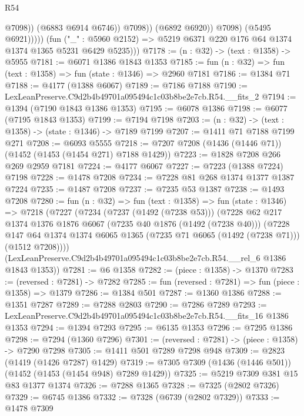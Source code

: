 \begin{lexlean}{R54}
\begin{coremodule}
                              @7098))
                          (@6883 @6914 @6746))
                        @7098))
                    (@6892 @6920))
                  @7098)
                (@5495 @6921)))))
        (fun ("_" : @5960 @2152) => @5219 @6371 @220 @176 @64 @1374 @1374 @1365 @5231 @6429 @5235)))
@7178 := (n : @32) -> (text : @1358) -> @5955
@7181 := @6071 @1386 @1843 @1353
@7185 := fun (n : @32) => fun (text : @1358) => fun (state : @1346) => @2960 @7181
@7186 := @1384 @71
@7188 := @4177 (@1388 @6067)
@7189 := @7186 @7188
@7190 := LexLeanPreserve.C9d2b4b49701a095494c1c03b8be2e7cb.R54.__fits_2
@7194 := @1394 (@7190 @1843 @1386 @1353)
@7195 := @6078 @1386
@7198 := @6077 (@7195 @1843 @1353)
@7199 := @7194 @7198
@7203 := (n : @32) -> (text : @1358) -> (state : @1346) -> @7189 @7199
@7207 := @1411 @71 @7188 @7199 @271
@7208 := @6093 @5555
@7218 := @7207 @7208 (@1436 (@1446 @71)) (@1452 (@1453 (@1454 @271) @7188 @1429))
@7223 := @1828 @7208 @266 @269 @2959 @7181
@7224 := @4177 @6067
@7227 := @7223 (@1388 @7224) @7198
@7228 := @1478 @7208
@7234 := @7228 @81 @268 @1374 @1377 @1387 @7224
@7235 := @1487 @7208
@7237 := @7235 @53 @1387
@7238 := @1493 @7208
@7280 := fun (n : @32) =>
  fun (text : @1358) =>
  fun (state : @1346) =>
  @7218
    (@7227
      (@7234
        (@7237 (@1492 (@7238 @53)))
        (@7228
          @62
          @217
          @1374
          @1376
          @1876
          @6067
          (@7235 @40 @1876 (@1492 (@7238 @40)))
          (@7228
            @147
            @64
            @1374
            @1374
            @6065
            @1365
            (@7235 @71 @6065 (@1492 (@7238 @71)))
            (@1512 @7208))))
      (LexLeanPreserve.C9d2b4b49701a095494c1c03b8be2e7cb.R54.__rel_6 @1386 @1843 @1353))
@7281 := @6 @1358
@7282 := (piece : @1358) -> @1370
@7283 := (reversed : @7281) -> @7282
@7285 := fun (reversed : @7281) => fun (piece : @1358) => @1379
@7286 := @1384 @501
@7287 := @1360 @1386
@7288 := @1351 @7287
@7289 := @7288 @2803
@7290 := @7286 @7289
@7293 := LexLeanPreserve.C9d2b4b49701a095494c1c03b8be2e7cb.R54.__fits_16 @1386 @1353
@7294 := @1394 @7293
@7295 := @6135 @1353
@7296 := @7295 @1386
@7298 := @7294 (@1360 @7296)
@7301 := (reversed : @7281) -> (piece : @1358) -> @7290 @7298
@7305 := @1411 @501 @7289 @7298 @948
@7309 := @2823 (@1419 (@1426 @7287) @1429)
@7319 := @7305 @7309 (@1436 (@1446 @501)) (@1452 (@1453 (@1454 @948) @7289 @1429))
@7325 := @5219 @7309 @381 @15 @83 @1377 @1374
@7326 := @7288 @1365
@7328 := @7325 (@2802 @7326)
@7329 := @6745 @1386
@7332 := @7328 (@6739 (@2802 @7329))
@7333 := @1478 @7309

\end{coremodule}
\end{lexlean}
